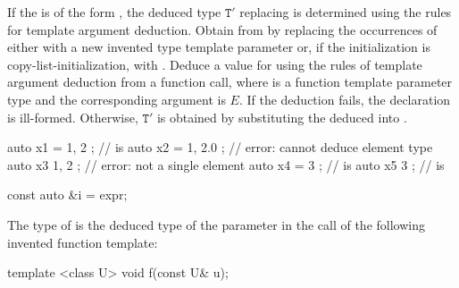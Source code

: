 \pnum
If the  is of the form
 ,
the deduced type
$\mathtt{T}'$ replacing 
is determined using the rules for template argument deduction.
Obtain  from
 by replacing the occurrences of
  either with
a new invented type template parameter  or,
if the initialization is copy-list-initialization, with
. Deduce a value for  using the rules
of template argument deduction from a function call,
where  is a
function template parameter type and
the corresponding argument is $E$.
If the deduction fails, the declaration is ill-formed.
Otherwise, $\mathtt{T}'$ is obtained by
substituting the deduced  into .
\begin{example}
\begin{codeblock}
auto x1 = { 1, 2 };             //  is 
auto x2 = { 1, 2.0 };           // error: cannot deduce element type
auto x3{ 1, 2 };                // error: not a single element
auto x4 = { 3 };                //  is 
auto x5{ 3 };                   //  is 
\end{codeblock}
\end{example}

\begin{example}
\begin{codeblock}
const auto &i = expr;
\end{codeblock}
The type of  is the deduced type of the parameter  in
the call  of the following invented function template:
\begin{codeblock}
template <class U> void f(const U& u);
\end{codeblock}
\end{example}

